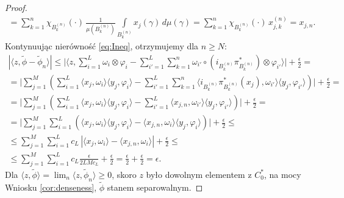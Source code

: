\begin{proof}
\begin{eqnarray}
=\sum \limits_{k=1}^{n} \chi_{B_{k}^{(n)}}(\cdot) \,
\frac{1}{\mu(B_{k}^{(n)})}
\int \limits_{B_{k}^{(n)}} x_{j}(\gamma) \, d\mu(\gamma)
=\sum \limits_{k=1}^{n} \chi_{B_{k}^{(n)}}(\cdot) \,
x_{j,k}^{(n)}=x_{j,n}.
\end{eqnarray}
Kontynuując nierówność \eqref{eq:Ineq}, otrzymujemy dla $n \geq N$:
\begin{multline}
|\langle z, \tilde{\phi} - \tilde{\phi}_{n} \rangle|\leq \Big |\langle z,
\sum \limits_{i=1}^{L} \omega_{i} \otimes \varphi_{i} -\sum \limits_{i'=1}^{L}
\sum \limits_{k=1}^{n}\omega_{i'} \circ (i_{B_{k}^{(n)}} \pi^{*}_{B_{k}^{(n)}})
\otimes \varphi_{i'}\rangle \Big | + \frac{\epsilon}{2} =\\
= \Big |  \sum \limits_{j=1}^{M}\left( \sum \limits_{i =1}^{L}
\langle x_{j}, \omega_{i} \rangle \langle y_{j}, \varphi_{i} \rangle -
\sum \limits_{i'=1}^{L} \sum \limits_{k=1}^{n}
\langle i_{B_{k}^{(n)}} \pi^{*}_{B_{k}^{(n)}} (x_{j}) ,
\omega_{i'} \rangle \langle y_{j}, \varphi_{i'} \rangle
\right) \Big |  + \frac{\epsilon}{2} =\\
= \Big | \sum \limits_{j=1}^{M}\left( \sum \limits_{i=1}^{L}
\langle x_{j}, \omega_{i} \rangle \langle y_{j}, \varphi_{i} \rangle  -
\sum \limits_{i'=1}^{L}\langle x_{j,n} , \omega_{i'} \rangle \langle y_{j}, \varphi_{i'} \rangle
\right) \Big |  + \frac{\epsilon}{2} =\\
= \Big | \sum \limits_{j=1}^{M} \sum \limits_{i=1}^{L}
\left(\langle x_{j}, \omega_{i} \rangle \langle y_{j}, \varphi_{i} \rangle  -
\langle x_{j,n} , \omega_{i} \rangle \langle y_{j}, \varphi_{i} \rangle
\right) \Big |  + \frac{\epsilon}{2} \leq \\
\leq \sum \limits_{j=1}^{M} \sum \limits_{i=1}^{L}
c_{L}  \, \left | \langle    x_{j}, \omega_{i} \rangle -
\langle x_{j,n} , \omega_{i} \rangle\right | + \frac{\epsilon}{2} \leq \\
\leq \sum \limits_{j=1}^{M} \sum \limits_{i=1}^{L}
c_{L}  \frac{\epsilon}{2 L M c_{L}}     + \frac{\epsilon}{2}
=  \frac{\epsilon}{2} +  \frac{\epsilon}{2} =  \epsilon.
\end{multline}
Dla  $\langle z , \tilde{\phi} \rangle  =
\lim_{n} \langle z , \tilde{\phi}_{n} \rangle \geq 0$,
skoro $z$ było dowolnym elementem z $C_{0}^{*}$,
na mocy Wniosku \ref{cor:denseness}, $\tilde{\phi}$ stanem separowalnym.
\end{proof}

